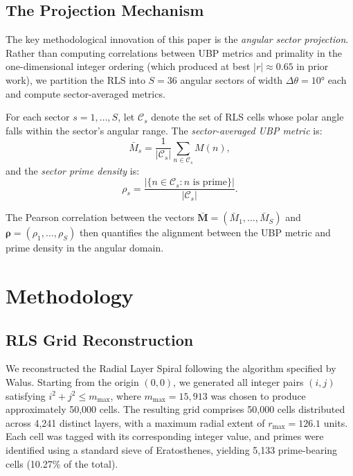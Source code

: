\documentclass[11pt,a4paper]{article}
\theoremstyle{definition}
\begin{document}
\subsection{The Projection Mechanism}\label{sec:projection}

The key methodological innovation of this paper is the \emph{angular sector projection}. Rather than computing correlations between UBP metrics and primality in the one-dimensional integer ordering (which produced at best $|r| \approx 0.65$ in prior work), we partition the RLS into $S = 36$ angular sectors of width $\Delta\theta = 10°$ each and compute sector-averaged metrics.

For each sector $s = 1, \ldots, S$, let $\mathcal{C}_s$ denote the set of RLS cells whose polar angle falls within the sector's angular range. The \emph{sector-averaged UBP metric} is:
\begin{equation}\label{eq:sector_avg}
\bar{M}_s = \frac{1}{|\mathcal{C}_s|} \sum_{n \in \mathcal{C}_s} M(n),
\end{equation}
and the \emph{sector prime density} is:
\begin{equation}\label{eq:prime_density}
\rho_s = \frac{|\{n \in \mathcal{C}_s : n \text{ is prime}\}|}{|\mathcal{C}_s|}.
\end{equation}

The Pearson correlation between the vectors $\bar{\mathbf{M}} = (\bar{M}_1, \ldots, \bar{M}_S)$ and $\boldsymbol{\rho} = (\rho_1, \ldots, \rho_S)$ then quantifies the alignment between the UBP metric and prime density in the angular domain.

\section{Methodology}\label{sec:method}

\subsection{RLS Grid Reconstruction}\label{sec:rls_recon}

We reconstructed the Radial Layer Spiral following the algorithm specified by Walus\cite{walus2026}. Starting from the origin $(0,0)$, we generated all integer pairs $(i, j)$ satisfying $i^2 + j^2 \leq m_{\max}$, where $m_{\max} = 15{,}913$ was chosen to produce approximately 50,000 cells. The resulting grid comprises 50,000 cells distributed across 4,241 distinct layers, with a maximum radial extent of $r_{\max} = 126.1$ units. Each cell was tagged with its corresponding integer value, and primes were identified using a standard sieve of Eratosthenes, yielding 5,133 prime-bearing cells (10.27\% of the total).
\end{document}
